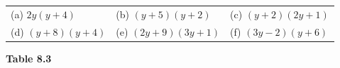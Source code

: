 \begin{enumerate}[noitemsep, label=\textbf{\arabic*}. ]
{{          }{ %
        \begin{center}
      \label{m39383*id270189}
    \noindent
      \tablelasttail{}
      \begin{xtabular}[t]{|l|l|l|}\hline
        (a) $2y\left(y+4\right)$ &
        (b) $\left(y+5\right)\left(y+2\right)$ &
        (c) $\left(y+2\right)\left(2y+1\right)$%
     \tabularnewline{}
        (d) $\left(y+8\right)\left(y+4\right)$ &
        (e) $\left(2y+9\right)\left(3y+1\right)$ &
        (f) $\left(3y-2\right)\left(y+6\right)$%
     \tabularnewline{}
    \end{xtabular}
      \end{center}
    \begin{center}{\small\bfseries Table 8.3}\end{center}
          } %
}
\end{enumerate}

